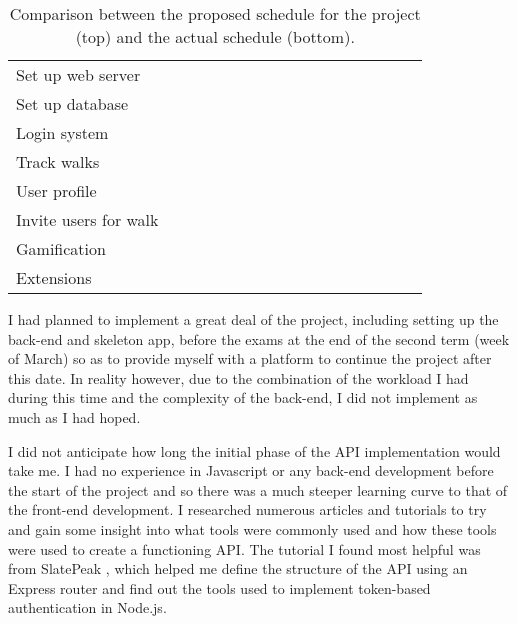 \begin{table}[hbt]
\begin{tabular}{|l|| *{16}{M{0.3cm}|}}
    Set up web server &&&&  &&&  &&&&&&&&&\\
    Set up database &&&&  &&&  &&&&&&&&&\\
    Login system &&&&&&& &&&&&&&&\\
    Track walks &&&&&&&&& &&&&&\\
    User profile &&&&&&&&&&&&&&&\\
    Invite users for walk &&&&&&&&&&&&&&&\\
    Gamification &&&&&&&&&&&&&&&&\\
    Extensions &&&&&&&&&&&&&&&&\\
    \hline
  \end{tabular}
  \caption{Comparison between the proposed schedule for the project (top) and the actual schedule (bottom).}
  \label{table:project-timeline-comparison}
\end{table}

I had planned to implement a great deal of the project, including setting up the back-end and skeleton app, before the exams at the end of the second term (week of  March) so as to provide myself with a platform to continue the project after this date. In reality however, due to the combination of the workload I had during this time and the complexity of the back-end, I did not implement as much as I had hoped.

I did not anticipate how long the initial phase of the API implementation would take me. I had no experience in Javascript or any back-end development before the start of the project and so there was a much steeper learning curve to that of the front-end development. I researched numerous articles and tutorials to try and gain some insight into what tools were commonly used and how these tools were used to create a functioning API. The tutorial I found most helpful was from SlatePeak \cite{Slatea}, which helped me define the structure of the API using an Express router and find out the tools used to implement token-based authentication in Node.js.

